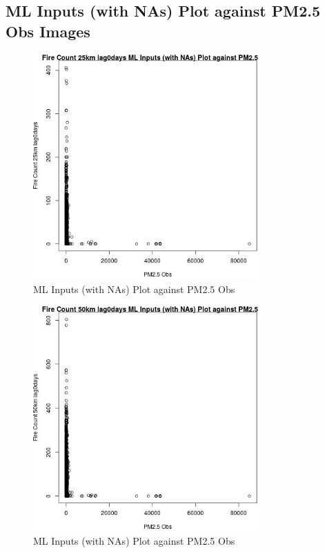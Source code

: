 
\subsection{ML Inputs (with NAs) Plot against PM2.5 Obs Images} 
 

\begin{figure} 
\centering  
\includegraphics[width=0.77\textwidth]{Code_Outputs/Report_ML_input_PM25_Step4_part_f_de_duplicated_aveswNAs_Fire_Count_25km_lag0daysvPM25_Obs.jpg} 
\caption{\label{fig:Report_ML_input_PM25_Step4_part_f_de_duplicated_aveswNAsFire_Count_25km_lag0daysvPM25_Obs}ML Inputs (with NAs) Plot against PM2.5 Obs} 
\end{figure} 
 

\begin{figure} 
\centering  
\includegraphics[width=0.77\textwidth]{Code_Outputs/Report_ML_input_PM25_Step4_part_f_de_duplicated_aveswNAs_Fire_Count_50km_lag0daysvPM25_Obs.jpg} 
\caption{\label{fig:Report_ML_input_PM25_Step4_part_f_de_duplicated_aveswNAsFire_Count_50km_lag0daysvPM25_Obs}ML Inputs (with NAs) Plot against PM2.5 Obs} 
\end{figure} 
 

